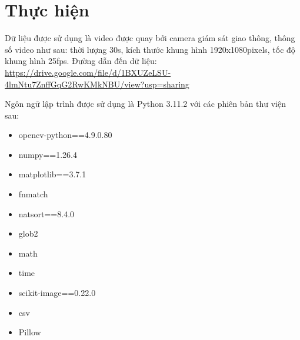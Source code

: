 \documentclass[a4paper]{article}
\begin{document}
\section{Thực hiện}
Dữ liệu được sử dụng là video được quay bởi camera giám sát giao thông, thông số video như sau: thời lượng 30s, kích thước khung hình 1920x1080pixels, tốc độ khung hình 25fps. Đường dẫn đến dữ liệu: \url{https://drive.google.com/file/d/1BXUZeLSU-4lmNtu7ZnffGqG2RwKMkNBU/view?usp=sharing}

Ngôn ngữ lập trình được sử dụng là Python 3.11.2 với các phiên bản thư viện sau: 
\begin{itemize}[label={}]
    \item opencv-python==4.9.0.80
    \item numpy==1.26.4
    \item matplotlib==3.7.1
    \item fnmatch
    \item natsort==8.4.0
    \item glob2
    \item math
    \item time
    \item scikit-image==0.22.0
    \item csv
    \item Pillow
\end{itemize}
\end{document}
